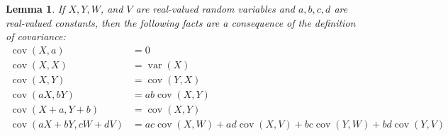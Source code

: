 \documentclass[11pt]{article}
\theoremstyle{plain} %
\newtheorem{lemma}[theorem]{Lemma}
\theoremstyle{remark}
\begin{document}
\begin{lemma}\label{lemma: covariance matrix properties}
  If $X, Y, W$, and $V$ are real-valued random variables and $a, b, c, d$ are real-valued constants, then the following facts are a consequence of the definition of covariance:
  $$
    \begin{aligned}
      \operatorname{cov}(X, a)             & =0                                                                                                                   \\
      \operatorname{cov}(X, X)             & =\operatorname{var}(X)                                                                                               \\
      \operatorname{cov}(X, Y)             & =\operatorname{cov}(Y, X)                                                                                            \\
      \operatorname{cov}(a X, b Y)         & =a b \operatorname{cov}(X, Y)                                                                                        \\
      \operatorname{cov}(X+a, Y+b)         & =\operatorname{cov}(X, Y)                                                                                            \\
      \operatorname{cov}(a X+b Y, c W+d V) & =a c \operatorname{cov}(X, W)+a d \operatorname{cov}(X, V)+b c \operatorname{cov}(Y, W)+b d \operatorname{cov}(Y, V)
    \end{aligned}
  $$
\end{lemma}
\end{document}
